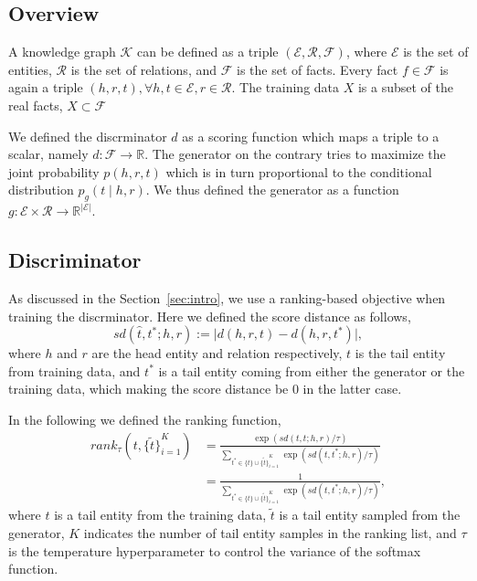 \documentclass[twocolumn,a4paper,10pt,review,5p]{elsarticle}
\begin{document}
\subsection{Overview}

A knowledge graph $\mathcal{K}$ can be defined as a triple $(\mathcal{E}, \mathcal{R}, \mathcal{F})$, where $\mathcal{E}$ is the set of entities, $\mathcal{R}$ is the set of relations, and $\mathcal{F}$ is the set of facts. Every fact $f\in \mathcal{F}$ is again a triple $(h, r, t), \forall h,t\in\mathcal{E}, r\in\mathcal{R}$. The training data $X$ is a subset of the real facts, $X \subset \mathcal{F}$

We defined the discrminator $d$ as a scoring function which maps a triple to a scalar, namely $d: \mathcal{F}\rightarrow \mathbb{R}$. The generator on the contrary tries to maximize the joint probability $p(h, r, t)$ which is in turn proportional to the conditional distribution $p_g(t \mid h, r)$. We thus defined the generator as a function $g: \mathcal{E} \times \mathcal{R} \rightarrow \mathbb{R}^{\lvert \mathcal{E} \rvert}$.

\subsection{Discriminator}

As discussed in the Section~\ref{sec:intro}, we use a ranking-based objective when training the discrminator. Here we defined the score distance as follows,
\[
    sd(\hat t, t^*; h, r) := \lvert d(h, r, t) - d(h, r, t^*) \rvert,
\]
where $h$ and $r$ are the head entity and relation respectively, $t$ is the tail entity from training data, and $t^*$ is a tail entity coming from either the generator or the training data, which making the score distance be 0 in the latter case.

In the following we defined the ranking function,
\begin{align*}
    rank_\tau(t, {\{\tilde t \}}_{i=1}^K)
    &= \frac{\exp(sd(t, t; h, r) / \tau)}
        {\sum_{t^*\in \{t\} \cup {\{\tilde t \}}_{i=1}^K } \exp (sd(t, t^*; h, r) / \tau) } \\
    &= \frac{1}
        {\sum_{t^*\in \{t\} \cup {\{\tilde t \}}_{i=1}^K } \exp (sd(t, t^*; h, r) / \tau) },
\end{align*}
where $t$ is a tail entity from the training data, $\tilde t$ is a tail entity sampled from the generator, $K$ indicates the number of tail entity samples in the ranking list, and $\tau$ is the temperature hyperparameter to control the variance of the softmax function.
\end{document}
